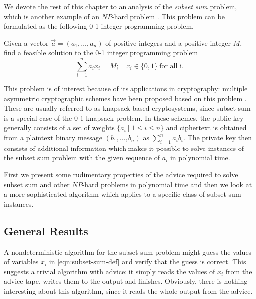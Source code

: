 We devote the rest of this chapter to an analysis of the \emph{subset sum}
problem, which is another example of an $NP$-hard problem
\cite{subset-sum-np-hard}. This problem can be formulated as the
following 0-1 integer programming problem.

\begin{definition}\label{definition:subset-sum}
    Given a vector $\vec{a} = (a_1, \dots, a_n)$ of positive integers and
    a positive integer $M$, find a feasible solution to the 0-1 integer
    programming problem
    \begin{equation}\label{eqn:subset-sum-def}
        \sum_{i=1}^n a_ix_i = M; \quad x_i \in \{0,1\} \  \text{for all i.}
    \end{equation}
\end{definition}

This problem is of interest because of its applications in cryptography:
multiple asymmetric cryptographic schemes have been proposed based on this
problem \cite{merkle-hellman, chor-rivest}. These are usually referred to
as knapsack-based cryptosystems, since subset sum is a special case of the
0-1 knapsack problem. In these schemes, the public key generally consists
of a set of weights $\{a_i \mid 1 \leq i \leq n\}$ and ciphertext is
obtained from a plaintext binary message $(b_1, \dots, b_n)$ as
$\sum_{i=1}^n a_ib_i$. The private key then consists of additional
information which makes it possible to solve instances of the subset sum
problem with the given sequence of $a_i$ in polynomial time.

First we present some rudimentary properties of the advice required to
solve subset sum and other $NP$-hard problems in polynomial time and then
we look at a more sophisticated algorithm which applies to a specific
class of subset sum instances.

\subsection{General Results}
\label{section:subset-sum-general}

A nondeterministic algorithm for the subset sum problem might guess the
values of variables $x_i$ in \eqref{eqn:subset-sum-def} and verify that
the guess is correct. This suggests a trivial algorithm with advice: it
simply reads the values of $x_i$ from the advice tape, writes them to the
output and finishes. Obviously, there is nothing interesting about this
algorithm, since it reads the whole output from the advice.

